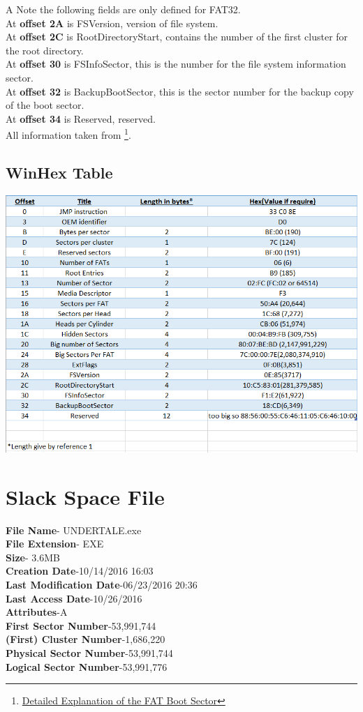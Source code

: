 \documentclass[12ptletterpaper]{paper}
\begin{document}
\begin{flushleft}
		A Note the following fields are only defined for FAT32.\\
		At \textbf{offset 2A} is FSVersion, version of file system.\\
		At \textbf{offset 2C} is RootDirectoryStart, contains the number of the first cluster for the root directory.\\
		At \textbf{offset 30} is FSInfoSector, this is the number for the file system information sector.\\
		At \textbf{offset 32} is BackupBootSector, this is the sector number for the backup copy of the boot sector.\\
		At \textbf{offset 34} is Reserved, reserved.\\
		All information taken from \footnote[1]{\hyperlink{Detailed Explanation of the FAT Boot Sector}{Detailed Explanation of the FAT Boot Sector}}.
		\subsection{WinHex Table}
		\includegraphics{graph.png}
		
		\section{Slack Space File}
		\textbf{File Name}- UNDERTALE.exe\\
		\textbf{File Extension}- EXE\\
		\textbf{Size}- 3.6MB\\
		\textbf{Creation Date}-10/14/2016 16:03\\
		\textbf{Last Modification Date}-06/23/2016 20:36\\
		\textbf{Last Access Date}-10/26/2016\\
		\textbf{Attributes}-A\\
		\textbf{First Sector Number}-53,991,744\\
		\textbf{(First) Cluster Number}-1,686,220\\
		\textbf{Physical Sector Number}-53,991,744\\
		\textbf{Logical Sector Number}-53,991,776\\
		

\end{flushleft}
\end{document}
